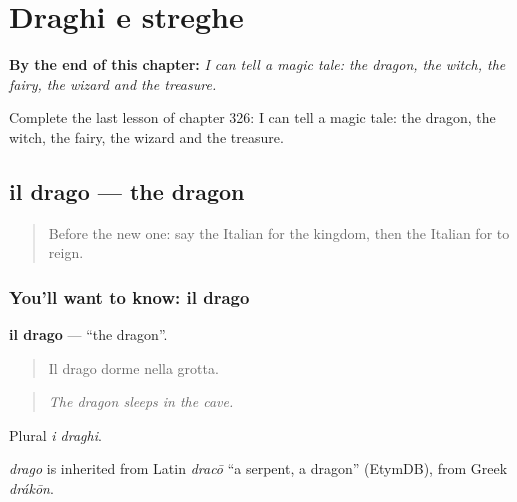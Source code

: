 
\chapter{Draghi e streghe}
\label{ch:it-draghi-e-streghe}

\begin{chapteropening}
\textbf{By the end of this chapter:} \emph{I can tell a magic tale: the dragon, the witch, the fairy, the wizard and the treasure.}

Complete the last lesson of chapter 326: I can tell a magic tale: the dragon, the witch, the fairy, the wizard and the treasure.
\end{chapteropening}

\section[il drago]{il drago — the dragon}

\label{lesson:IT-C326-drago}



\begin{quote}
Before the new one: say the Italian for the kingdom, then the Italian for to reign.
\end{quote}

\subsection*{You'll want to know: il drago}
\textbf{il drago} — \textquotedblleft{}the dragon\textquotedblright{}.

\begin{quote}
Il drago dorme nella grotta.
\end{quote}

\begin{quote}
\emph{The dragon sleeps in the cave.}
\end{quote}

Plural \emph{i draghi}.

\begin{cousinweb}
\emph{drago} is inherited from Latin \emph{dracō} \textquotedblleft{}a serpent, a dragon\textquotedblright{} (EtymDB), from Greek \emph{drákōn}.
\end{cousinweb}

